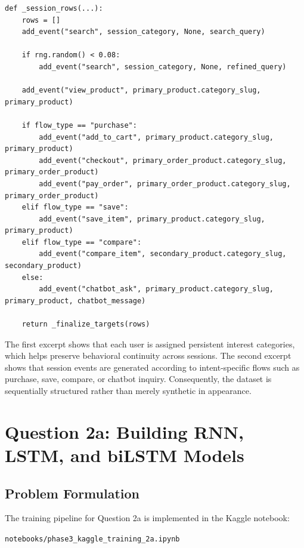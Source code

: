 \documentclass[12pt,a4paper]{article}
\begin{document}
\begin{lstlisting}[caption={Representative code for session-flow generation}]
def _session_rows(...):
    rows = []
    add_event("search", session_category, None, search_query)

    if rng.random() < 0.08:
        add_event("search", session_category, None, refined_query)

    add_event("view_product", primary_product.category_slug, primary_product)

    if flow_type == "purchase":
        add_event("add_to_cart", primary_product.category_slug, primary_product)
        add_event("checkout", primary_order_product.category_slug, primary_order_product)
        add_event("pay_order", primary_order_product.category_slug, primary_order_product)
    elif flow_type == "save":
        add_event("save_item", primary_product.category_slug, primary_product)
    elif flow_type == "compare":
        add_event("compare_item", secondary_product.category_slug, secondary_product)
    else:
        add_event("chatbot_ask", primary_product.category_slug, primary_product, chatbot_message)

    return _finalize_targets(rows)
\end{lstlisting}

The first excerpt shows that each user is assigned persistent interest categories, which helps preserve behavioral continuity across sessions. The second excerpt shows that session events are generated according to intent-specific flows such as purchase, save, compare, or chatbot inquiry. Consequently, the dataset is sequentially structured rather than merely synthetic in appearance.

\clearpage
\section{Question 2a: Building RNN, LSTM, and biLSTM Models}

\subsection{Problem Formulation}
The training pipeline for Question 2a is implemented in the Kaggle notebook:
\begin{center}
\texttt{notebooks/phase3\_kaggle\_training\_2a.ipynb}
\end{center}
\end{document}
